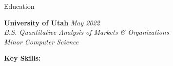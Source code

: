 \documentclass{resume/resume}
\begin{document}
\begin{rSection}{Education}

{\bf University of Utah} \hfill {\em May 2022}
\vspace{2pt}
\emph{
    \\ B.S. Quantitative Analysis of Markets \& Organizations
    \\ Minor Computer Science
}

%
%
%
%
%
%
%   
%
%
%
%

%
%
{\bf Key Skills:}
\vspace{-1.83em}


\end{rSection}
\end{document}
